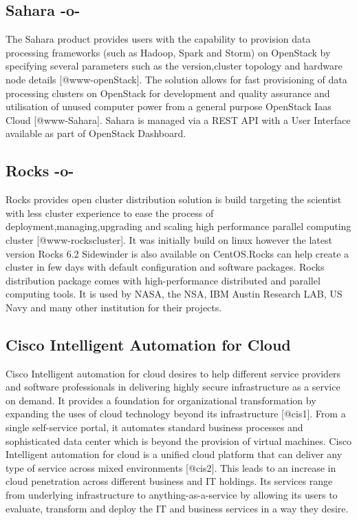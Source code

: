 \subsection{Sahara -o-}

The Sahara product provides users with the capability to provision
data processing frameworks (such as Hadoop, Spark and Storm) on
OpenStack by specifying several parameters such as the version,cluster
topology and hardware node details [@www-openStack]. The solution
allows for fast provisioning of data processing clusters on OpenStack
for development and quality assurance and utilisation of unused
computer power from a general purpose OpenStack Iaas
Cloud [@www-Sahara].  Sahara is managed via a REST API with a User
Interface available as part of OpenStack Dashboard.



\subsection{Rocks -o-}

Rocks provides open cluster distribution solution is build targeting
the scientist with less cluster experience to ease the process of
deployment,managing,upgrading and scaling high performance parallel
computing cluster [@www-rockscluster].  It was initially build on
linux however the latest version Rocks 6.2 Sidewinder is also
available on CentOS.Rocks can help create a cluster in few days with
default configuration and software packages.  Rocks distribution
package comes with high-performance distributed and parallel computing
tools. It is used by NASA, the NSA, IBM Austin Research LAB, US Navy
and many other institution for their projects.



\subsection{Cisco Intelligent Automation for Cloud}

Cisco Intelligent automation for cloud desires to help different
service providers and software professionals in delivering highly
secure infrastructure as a service on demand. It provides a foundation
for organizational transformation by expanding the uses of cloud
technology beyond its infrastructure [@cis1]. From a single
self-service portal, it automates standard business processes and
sophisticated data center which is beyond the provision of virtual
machines. Cisco Intelligent automation for cloud is a unified cloud
platform that can deliver any type of service across mixed
environments [@cis2]. This leads to an increase in cloud
penetration across different business and IT holdings. Its services
range from underlying infrastructure to anything-as-a-service by
allowing its users to evaluate, transform and deploy the IT and
business services in a way they desire.

